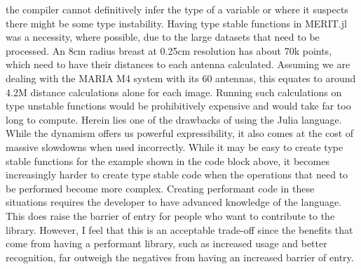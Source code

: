 the compiler cannot definitively infer the type of a variable or where it suspects there might be some type instability.
Having type stable functions in MERIT.jl was a necessity, where possible, due to the large datasets that need to be processed. An 8cm
radius breast at 0.25cm resolution has about 70k points, which need to have their distances to each antenna calculated.
Assuming we are dealing with the MARIA M4 system with its 60 antennas, this equates to around 4.2M distance calculations
alone for each image. Running such calculations on type unstable functions would be prohibitively expensive and would
take far too long to compute. Herein lies one of the drawbacks of using the Julia language. While the dynamism offers us
powerful expressibility, it also comes at the cost of massive slowdowns when used incorrectly. While it may be easy to
create type stable functions for the example shown in the code block above, it becomes increasingly harder to create
type stable code when the operations that need to be performed become more complex. Creating performant code in these
situations requires the developer to have advanced knowledge of the language. This does raise the barrier of entry for
people who want to contribute to the library. However, I feel that this is an acceptable trade-off since the benefits
that come from having a performant library, such as increased usage and better recognition, far outweigh the negatives
from having an increased barrier of entry.
